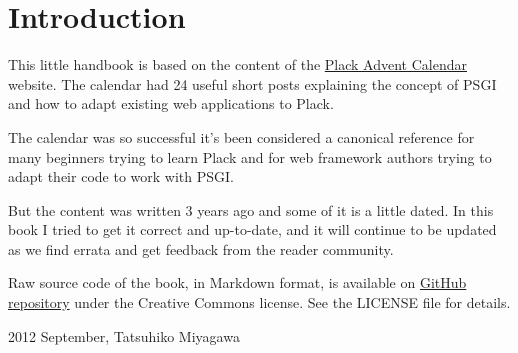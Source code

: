 \chapter{Introduction}\label{introduction}

This little handbook is based on the content of the
\href{http://advent.plackperl.org/}{Plack Advent Calendar} website. The
calendar had 24 useful short posts explaining the concept of PSGI and
how to adapt existing web applications to Plack.

The calendar was so successful it's been considered a canonical
reference for many beginners trying to learn Plack and for web framework
authors trying to adapt their code to work with PSGI.

But the content was written 3 years ago and some of it is a little
dated. In this book I tried to get it correct and up-to-date, and it
will continue to be updated as we find errata and get feedback from the
reader community.

Raw source code of the book, in Markdown format, is available on
\href{https://github.com/miyagawa/plack-handbook}{GitHub repository}
under the Creative Commons license. See the LICENSE file for details.

2012 September, Tatsuhiko Miyagawa



